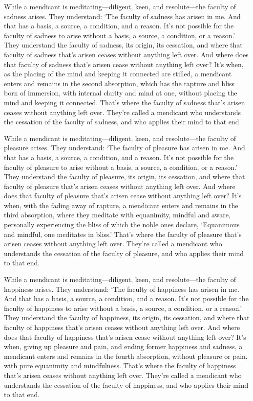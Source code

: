 \documentclass[12pt,openany]{book}%
\begin{document}
While a mendicant is meditating—diligent, keen, and resolute—the faculty of sadness arises. They understand: ‘The faculty of sadness has arisen in me. And that has a basis, a source, a condition, and a reason. It’s not possible for the faculty of sadness to arise without a basis, a source, a condition, or a reason.’ They understand the faculty of sadness, its origin, its cessation, and where that faculty of sadness that’s arisen ceases without anything left over. And where does that faculty of sadness that’s arisen cease without anything left over? It’s when, as the placing of the mind and keeping it connected are stilled, a mendicant enters and remains in the second absorption, which has the rapture and bliss born of immersion, with internal clarity and mind at one, without placing the mind and keeping it connected. That’s where the faculty of sadness that’s arisen ceases without anything left over. They’re called a mendicant who understands the cessation of the faculty of sadness, and who applies their mind to that end. 

While a mendicant is meditating—diligent, keen, and resolute—the faculty of pleasure arises. They understand: ‘The faculty of pleasure has arisen in me. And that has a basis, a source, a condition, and a reason. It’s not possible for the faculty of pleasure to arise without a basis, a source, a condition, or a reason.’ They understand the faculty of pleasure, its origin, its cessation, and where that faculty of pleasure that’s arisen ceases without anything left over. And where does that faculty of pleasure that’s arisen cease without anything left over? It’s when, with the fading away of rapture, a mendicant enters and remains in the third absorption, where they meditate with equanimity, mindful and aware, personally experiencing the bliss of which the noble ones declare, ‘Equanimous and mindful, one meditates in bliss.’ That’s where the faculty of pleasure that’s arisen ceases without anything left over. They’re called a mendicant who understands the cessation of the faculty of pleasure, and who applies their mind to that end. 

While a mendicant is meditating—diligent, keen, and resolute—the faculty of happiness arises. They understand: ‘The faculty of happiness has arisen in me. And that has a basis, a source, a condition, and a reason. It’s not possible for the faculty of happiness to arise without a basis, a source, a condition, or a reason.’ They understand the faculty of happiness, its origin, its cessation, and where that faculty of happiness that’s arisen ceases without anything left over. And where does that faculty of happiness that’s arisen cease without anything left over? It’s when, giving up pleasure and pain, and ending former happiness and sadness, a mendicant enters and remains in the fourth absorption, without pleasure or pain, with pure equanimity and mindfulness. That’s where the faculty of happiness that’s arisen ceases without anything left over. They’re called a mendicant who understands the cessation of the faculty of happiness, and who applies their mind to that end. 
\end{document}
